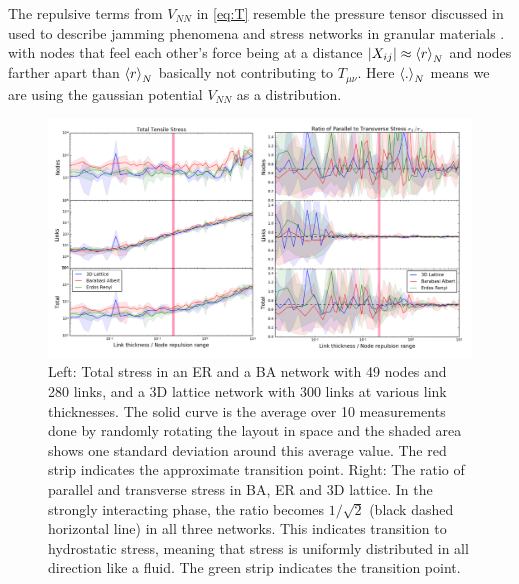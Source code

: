 \documentclass[endfloats,nofootinbib,preprint,floatfix,titlepage,superscriptaddress]{revtex4} %
\begin{document}
The repulsive terms from $V_{NN}$ in \eqref{eq:T} resemble the pressure tensor discussed in \citep{stillinger1984packing} used to describe jamming phenomena and stress networks in granular materials  \citep{o2002random,o2003jamming}.  
with nodes that feel each other's force being at a distance $|X_{ij}|\approx \left<r\right>_N$ and nodes farther apart than $\left<r\right>_N$ basically not contributing to $T_{\mu\nu}$. 
Here  $\left<.\right>_N$ means we are using the gaussian potential $V_{NN}$ as a distribution. 
\begin{figure}
    \centering
    \includegraphics[width=1\columnwidth]{fig-09-19/stress3.png}
    \caption{Left: Total stress in an ER and a BA network with 49 nodes and 280 links, and a 3D lattice network with 300 links at various link thicknesses. 
    The solid curve is the average over 10 measurements done by randomly rotating the layout in space and the  shaded area shows one standard deviation around this average value. 
    The red strip indicates the approximate transition point.   
    Right: The ratio of parallel and transverse stress in BA, ER and 3D lattice. In the strongly interacting phase, the ratio becomes $1/\sqrt{2}$ (black dashed horizontal line) in  all three networks. 
    This indicates transition to hydrostatic stress, meaning that stress is uniformly distributed in all direction like a fluid. 
    The green strip indicates the transition point.}
    \label{fig:stress2}
\end{figure}
\end{document}
